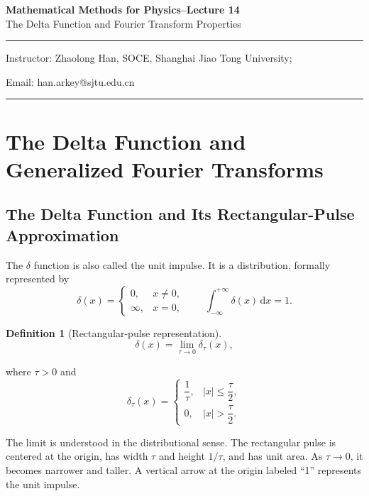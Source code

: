 \documentclass[11pt,a4paper]{article}
\theoremstyle{definition}
\newtheorem{definition}{Definition}
\theoremstyle{plain}
\begin{document}
\begin{center}
    {\LARGE \textbf{Mathematical Methods for Physics--Lecture 14}} \\[0.6em]
    {\large The Delta Function and Fourier Transform Properties}
\end{center}

\vspace{-0.5em}
\noindent\rule{\textwidth}{0.5pt}
\vspace{0.3em}

\begin{center}
    Instructor: Zhaolong Han, SOCE, Shanghai Jiao Tong University;
\end{center}

\vspace{-0.6em}
\noindent Email: han.arkey@sjtu.edu.cn

\vspace{0.4em}
\noindent\rule{\textwidth}{0.5pt}

\vspace{0.8em}

\section{The Delta Function and Generalized Fourier Transforms}

\subsection{The Delta Function and Its Rectangular-Pulse Approximation}

The \(\delta\) function is also called the unit impulse. It is a distribution,
formally represented by
\[
\delta(x)=
\begin{cases}
0,&x\ne0,\\
\infty,&x=0,
\end{cases}
\qquad
\int_{-\infty}^{+\infty}\delta(x)\,\mathrm dx=1.
\]

\begin{definition}[Rectangular-pulse representation]
\[
\delta(x)=\lim_{\tau\to0}\delta_\tau(x),
\]

where \(\tau>0\) and
\[
\delta_\tau(x)=
\begin{cases}
\dfrac1{\tau},&|x|\le\dfrac{\tau}{2},\\[4pt]
0,&|x|>\dfrac{\tau}{2}.
\end{cases}
\]

\end{definition}

The limit is understood in the distributional sense. The rectangular pulse is
centered at the origin, has width \(\tau\) and height \(1/\tau\), and
has unit area. As \(\tau\to0\), it becomes narrower and taller. A vertical arrow at the origin labeled ``1'' represents the unit impulse.
\end{document}
